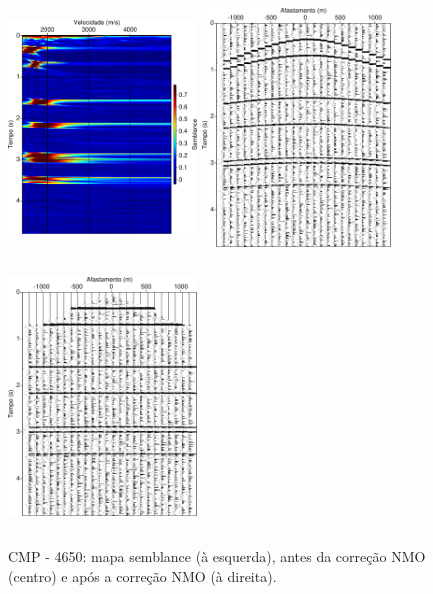 \begin{figure}[H]
\includegraphics[width=5cm,height=7cm]{figuras/cap2/Semblance_color_4650.pdf}
\includegraphics[width=5cm,height=7cm]{figuras/cap2/CMP_4650.pdf}
\includegraphics[width=5cm,height=7cm]{figuras/cap2/CMP_After_NMO_4650.pdf}
\caption{CMP - 4650: mapa semblance (à esquerda), antes da correção NMO (centro) e após a correção NMO (à direita).}
\label{fig:correcao_nmo}
\end{figure}

